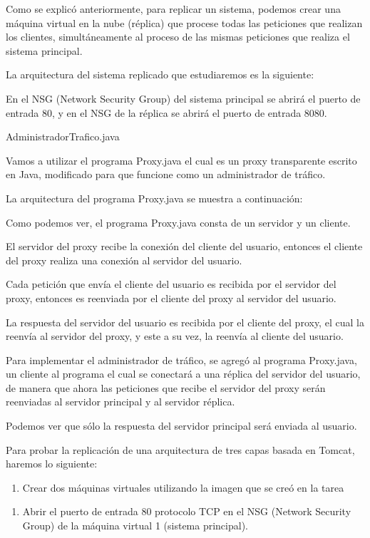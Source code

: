 Como se explicó anteriormente, para replicar un sistema, podemos crear una máquina virtual en la nube (réplica) que procese todas las peticiones que realizan los clientes, simultáneamente al proceso de las mismas peticiones que realiza el sistema principal.

La arquitectura del sistema replicado que estudiaremos es la siguiente:

En el NSG (Network Security Group) del sistema principal se abrirá el puerto de entrada 80, y en el NSG de la réplica se abrirá el puerto de entrada 8080.

AdministradorTrafico.java

Vamos a utilizar el programa Proxy.java el cual es un proxy transparente escrito en Java, modificado para que funcione como un administrador de tráfico.

La arquitectura del programa Proxy.java se muestra a continuación:

Como podemos ver, el programa Proxy.java consta de un servidor y un cliente.

El servidor del proxy recibe la conexión del cliente del usuario, entonces el cliente del proxy realiza una conexión al servidor del usuario.

Cada petición que envía el cliente del usuario es recibida por el servidor del proxy, entonces es reenviada por el cliente del proxy al servidor del usuario.

La respuesta del servidor del usuario es recibida por el cliente del proxy, el cual la reenvía al servidor del proxy, y este a su vez, la reenvía al cliente del usuario.

Para implementar el administrador de tráfico, se agregó al programa Proxy.java, un cliente al programa el cual se conectará a una réplica del servidor del usuario, de manera que ahora las peticiones que recibe el servidor del proxy serán reenviadas al servidor principal y al servidor réplica.

Podemos ver que sólo la respuesta del servidor principal será enviada al usuario.

Para probar la replicación de una arquitectura de tres capas basada en Tomcat, haremos lo siguiente:

\begin{enumerate}
\item Crear dos máquinas virtuales utilizando la imagen que se creó en la tarea
\end{enumerate}

\begin{enumerate}
\item Abrir el puerto de entrada 80 protocolo TCP en el NSG (Network Security Group) de la máquina virtual 1 (sistema principal).
\end{enumerate}

